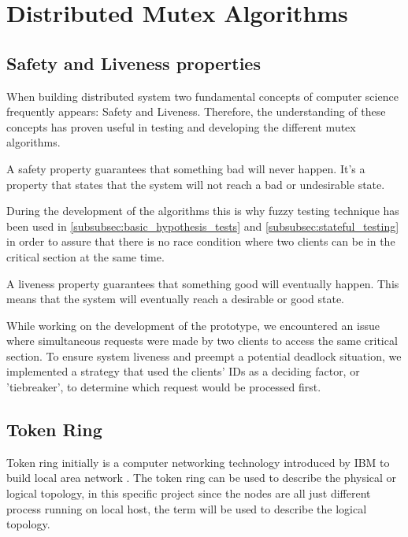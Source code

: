 \chapter{\centering Distributed Mutex Algorithms}
\label{chap:algorithms}

\section{Safety and Liveness properties}
When building distributed system two fundamental concepts of computer science 
frequently appears: Safety and Liveness. Therefore, the understanding of these concepts 
has proven useful in testing and developing the different mutex algorithms.

A safety property guarantees that something bad will never happen. It's a 
property that states that the system will not reach a bad or undesirable state. 

During the development of the algorithms this is why fuzzy testing technique has 
been used in \ref{subsubsec:basic_hypothesis_tests} and \ref{subsubsec:stateful_testing}
in order to assure that there is no race condition where two clients can be in
the critical section at the same time.

 A liveness property guarantees that something good will eventually happen. 
 This means that the system will eventually reach a desirable or good state.

While working on the development of the prototype, we encountered an issue where 
simultaneous requests were made by two clients to access the same critical section. 
To ensure system liveness and preempt a potential deadlock situation, we implemented 
a strategy that used the clients' IDs as a deciding factor, or 'tiebreaker', to 
determine which request would be processed first.
 
\section{Token Ring}
Token ring initially is a computer networking technology introduced by IBM 
to build local area network \cite{wiki_token_ring}. The token ring can be used 
to describe the physical or logical topology, in this specific project since 
the nodes are all just different process running on local host, the term will be
used to describe the logical topology.

